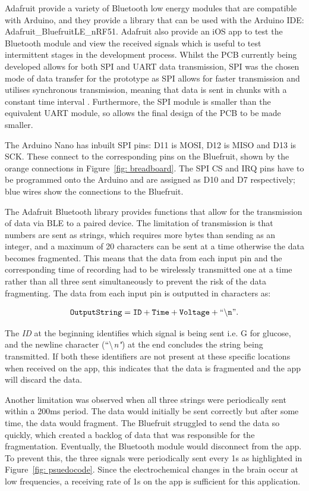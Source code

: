 Adafruit provide a variety of Bluetooth low energy modules that are compatible with Arduino, and they provide a library that can be used with the Arduino IDE: Adafruit\_BluefruitLE\_nRF51. Adafruit also provide an iOS app to test the Bluetooth module and view the received signals which is useful to test intermittent stages in the development process. Whilst the PCB currently being developed allows for both SPI and UART data transmission, SPI was the chosen mode of data transfer for the prototype as SPI allows for faster transmission \cite{totalphase2016} and utilises synchronous transmission, meaning that data is sent in chunks with a constant time interval \cite{teachcomputerscience2018}. Furthermore, the SPI module is smaller than the equivalent UART module, so allows the final design of the PCB to be made smaller.

The Arduino Nano has inbuilt SPI pins: D11 is MOSI, D12 is MISO and D13 is SCK. These connect to the corresponding pins on the Bluefruit, shown by the orange connections in Figure~\ref{fig: breadboard}. The SPI CS and IRQ pins have to be programmed onto the Arduino and are assigned as D10 and D7 respectively; blue wires show the connections to the Bluefruit.

The Adafruit Bluetooth library provides functions that allow for the transmission of data via BLE to a paired device. The limitation of transmission is that numbers are sent as strings, which requires more bytes than sending as an integer, and a maximum of 20 characters can be sent at a time \cite{Townsend2018} otherwise the data becomes fragmented. This means that the data from each input pin and the corresponding time of recording had to be wirelessly transmitted one at a time rather than all three sent simultaneously to prevent the risk of the data fragmenting. The data from each input pin is outputted in characters as:

\begin{align}
    \tt{OutputString = ID + Time + Voltage + ``\backslash n"}.
    \nonumber
\end{align}

The \textit{ID} at the beginning identifies which signal is being sent i.e. G for glucose, and the newline character (\textit{$``\backslash$n"}) at the end concludes the string being transmitted. If both these identifiers are not present at these specific locations when received on the app, this indicates that the data is fragmented and the app will discard the data. 

Another limitation was observed when all three strings were periodically sent within a 200ms period. The data would initially be sent correctly but after some time, the data would fragment. The Bluefruit struggled to send the data so quickly, which created a backlog of data that was responsible for the fragmentation. Eventually, the Bluetooth module would disconnect from the app. To prevent this, the three signals were periodically sent every 1s as highlighted in Figure~\ref{fig: psuedocode}. Since the electrochemical changes in the brain occur at low frequencies, a receiving rate of 1s on the app is sufficient for this application. 





